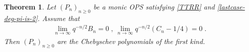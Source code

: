 \documentclass{amsart}
\newtheorem{theorem}{Theorem}[section]
\theoremstyle{remark}
\newtheorem{remark}[theorem]{Remark}
\numberwithin{equation}{section}
\begin{document}
\begin{theorem}\label{T2}
Let $(P_n)_{n\geq 0}$ be a monic OPS satisfying \eqref{TTRR} and \eqref{lastcase-deg-pi-is-2}. Assume that 
\begin{align}
\lim_{n \rightarrow \infty} q^{-n/2}B_n=0\;,~\lim_{n \rightarrow \infty} q^{-n/2}(C_n-1/4)=0\;.\label{assumptions-second-case}
\end{align}
 Then $(P_n)_{n\geq 0}$ are the Chebyschev polynomials of the first kind. 
\end{theorem}
\end{document}
